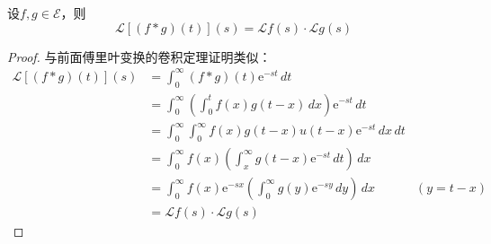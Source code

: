 \documentclass{ctexbook}
\begin{document}
\begin{theorem}[卷积定理]
    设$f,g\in\mathcal{E} $，则
    \[\mathcal{L} [(f*g)(t)](s)=\mathcal{L} f(s)\cdot \mathcal{L} g(s)\]
\end{theorem}
\begin{proof}
与前面傅里叶变换的卷积定理证明类似：
    \begin{align*}
        \mathcal{L} [(f*g)(t)](s)&=\int_0^{\infty}(f*g)(t)\mathrm{e}^{-st}\,dt\\
        &=\int_0^{\infty}\left(\int_0^t f(x)g(t-x)\,dx\right)\mathrm{e}^{-st}\,dt\\
        &=\int_0^{\infty}\int_0^{\infty}f(x)g(t-x)u(t-x)\mathrm{e}^{-st}\,dx\,dt\\
        &=\int_0^{\infty}f(x)\left(\int_x^{\infty}g(t-x)\mathrm{e}^{-st}\,dt\right)\,dx\\
        &=\int_0^{\infty}f(x)\mathrm{e}^{-sx}\left(\int_0^{\infty}g(y)\mathrm{e}^{-sy}\,dy\right)\,dx&(y=t-x)\\
        &=\mathcal{L} f(s)\cdot \mathcal{L} g(s)
    \end{align*}
\end{proof}
\end{document}
